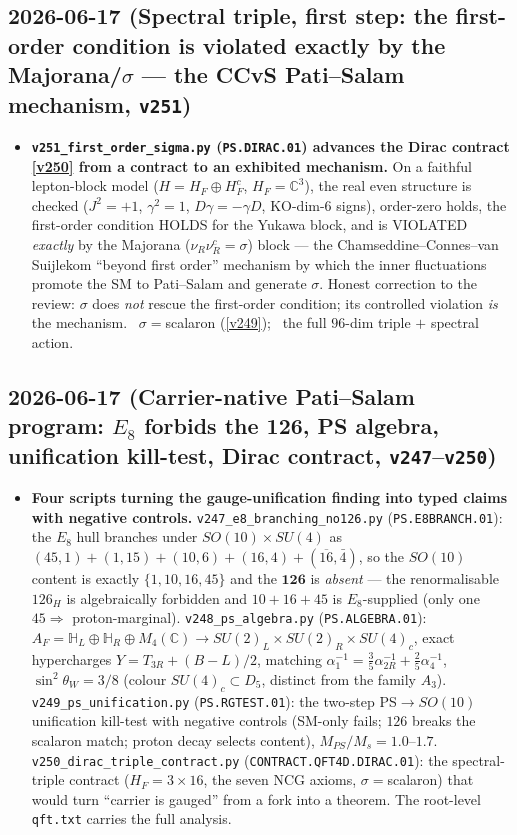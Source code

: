 \subsection*{2026-06-17 (Spectral triple, first step: the first-order condition is violated exactly by the Majorana/$\sigma$ --- the CCvS Pati--Salam mechanism, \texttt{v251})}
\begin{itemize}
\item \textbf{\texttt{v251\_first\_order\_sigma.py} (\texttt{PS.DIRAC.01}) advances the Dirac contract
  \vref{v250} from a contract to an exhibited mechanism.} On a faithful lepton-block model
  ($H=H_F\oplus H_F^c$, $H_F=\mathbb C^3$), the real even structure is checked ($J^2{=}{+}1$,
  $\gamma^2{=}1$, $D\gamma{=}{-}\gamma D$, KO-dim-6 signs), order-zero holds, the first-order condition
  HOLDS for the Yukawa block, and is VIOLATED \emph{exactly} by the Majorana ($\nu_R\nu_R^c=\sigma$) block
  --- the Chamseddine--Connes--van Suijlekom ``beyond first order'' mechanism by which the inner
  fluctuations promote the SM to Pati--Salam and generate $\sigma$. Honest correction to the review:
  $\sigma$ does \emph{not} rescue the first-order condition; its controlled violation \emph{is} the
  mechanism. \mC\ $\sigma={}$scalaron (\vref{v249}); \mO\ the full $96$-dim triple $+$ spectral action.
\end{itemize}

\subsection*{2026-06-17 (Carrier-native Pati--Salam program: $E_8$ forbids the 126, PS algebra, unification kill-test, Dirac contract, \texttt{v247}--\texttt{v250})}
\begin{itemize}
\item \textbf{Four scripts turning the gauge-unification finding into typed claims with negative controls.}
  \texttt{v247\_e8\_branching\_no126.py} (\texttt{PS.E8BRANCH.01}): the $E_8$ hull branches under
  $SO(10){\times}SU(4)$ as $(45,1){+}(1,15){+}(10,6){+}(16,4){+}(\overline{16},\bar4)$, so the $SO(10)$
  content is exactly $\{1,10,16,45\}$ and the $\mathbf{126}$ is \emph{absent} --- the renormalisable
  $126_H$ is algebraically forbidden and $10{+}16{+}45$ is $E_8$-supplied (only one $45\Rightarrow$
  proton-marginal). \texttt{v248\_ps\_algebra.py} (\texttt{PS.ALGEBRA.01}):
  $A_F=\mathbb H_L\oplus\mathbb H_R\oplus M_4(\mathbb C)\to SU(2)_L{\times}SU(2)_R{\times}SU(4)_c$, exact
  hypercharges $Y=T_{3R}+(B{-}L)/2$, matching $\alpha_1^{-1}=\tfrac35\alpha_{2R}^{-1}+\tfrac25\alpha_4^{-1}$,
  $\sin^2\theta_W=3/8$ (colour $SU(4)_c\subset D_5$, distinct from the family $A_3$).
  \texttt{v249\_ps\_unification.py} (\texttt{PS.RGTEST.01}): the two-step PS$\to SO(10)$ unification kill-test
  with negative controls (SM-only fails; $126$ breaks the scalaron match; proton decay selects content),
  $M_{PS}/M_s=1.0$--$1.7$. \texttt{v250\_dirac\_triple\_contract.py} (\texttt{CONTRACT.QFT4D.DIRAC.01}): the
  spectral-triple contract ($H_F=3{\times}16$, the seven NCG axioms, $\sigma=$scalaron) that would turn
  ``carrier is gauged'' from a fork into a theorem. The root-level \texttt{qft.txt} carries the full analysis.
\end{itemize}


